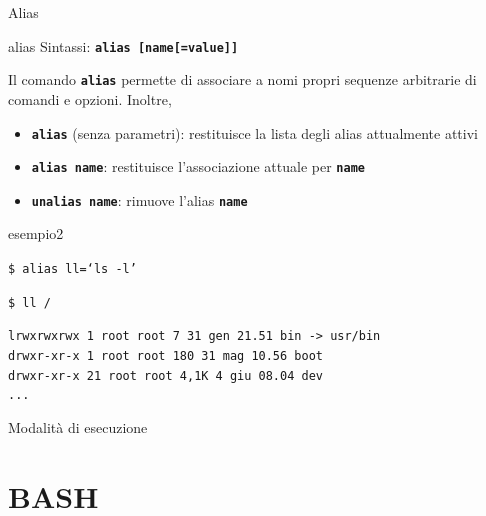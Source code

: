 \documentclass{beamer}
\begin{document}
    \begin{frame}{Alias}
        \begin{block}{alias}
            \small
            Sintassi: \texttt{\textbf{alias [name[=value]]}}

            Il comando \texttt{\textbf{alias}} permette di associare a nomi propri sequenze arbitrarie
            di comandi e opzioni. Inoltre,

            \begin{itemize}
                \item \texttt{\textbf{alias}} (senza parametri): restituisce la lista degli alias attualmente attivi
                \item \texttt{\textbf{alias name}}: restituisce l'associazione attuale per \texttt{\textbf{name}}
                \item \texttt{\textbf{unalias name}}: rimuove l'alias \texttt{\textbf{name}}
            \end{itemize}
        \end{block}

        \begin{exampleblock}{esempio2}
            \scriptsize

            \texttt{\$ alias ll=`ls -l'}
            
            \texttt{\$ ll /}

            \texttt{lrwxrwxrwx   1 root root    7 31 gen 21.51 bin -> usr/bin \\
            drwxr-xr-x   1 root root  180 31 mag 10.56 boot \\
            drwxr-xr-x  21 root root 4,1K  4 giu 08.04 dev \\
            ...
            }
        \end{exampleblock}
    \end{frame}

    \begin{frame}{Modalità di esecuzione}
    \end{frame}

    \section{BASH}


    
\end{document}
